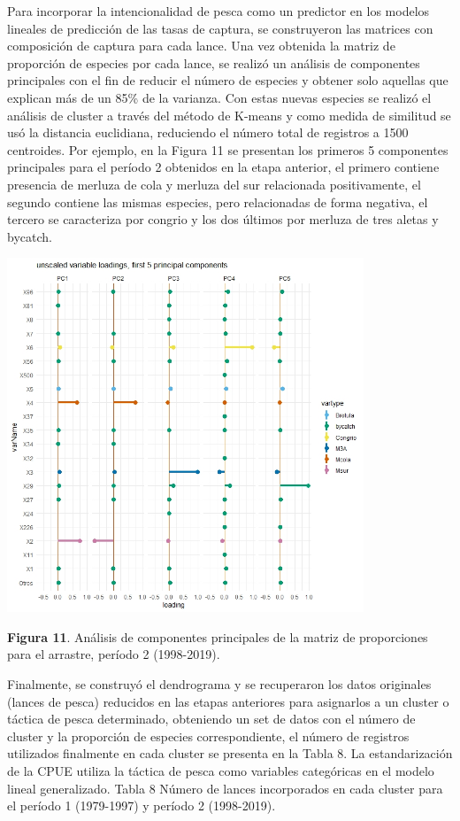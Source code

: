 \documentclass[
  spanish,
]{article}
\begin{document}
Para incorporar la intencionalidad de pesca como un predictor en los
modelos lineales de predicción de las tasas de captura, se construyeron
las matrices con composición de captura para cada lance. Una vez
obtenida la matriz de proporción de especies por cada lance, se realizó
un análisis de componentes principales con el fin de reducir el número
de especies y obtener solo aquellas que explican más de un 85\% de la
varianza. Con estas nuevas especies se realizó el análisis de cluster a
través del método de K-means y como medida de similitud se usó la
distancia euclidiana, reduciendo el número total de registros a 1500
centroides. Por ejemplo, en la Figura 11 se presentan los primeros 5
componentes principales para el período 2 obtenidos en la etapa
anterior, el primero contiene presencia de merluza de cola y merluza del
sur relacionada positivamente, el segundo contiene las mismas especies,
pero relacionadas de forma negativa, el tercero se caracteriza por
congrio y los dos últimos por merluza de tres aletas y bycatch.

\begin{center}
\includegraphics[width=0.8\textwidth]{Figuras/Figura_11.png}
\end{center}

\small \textbf{Figura 11}. Análisis de componentes principales de la
matriz de proporciones para el arrastre, período 2 (1998-2019).
\vspace{0.5cm} \normalsize

Finalmente, se construyó el dendrograma y se recuperaron los datos
originales (lances de pesca) reducidos en las etapas anteriores para
asignarlos a un cluster o táctica de pesca determinado, obteniendo un
set de datos con el número de cluster y la proporción de especies
correspondiente, el número de registros utilizados finalmente en cada
cluster se presenta en la Tabla 8. La estandarización de la CPUE utiliza
la táctica de pesca como variables categóricas en el modelo lineal
generalizado. Tabla 8 Número de lances incorporados en cada cluster para
el período 1 (1979-1997) y período 2 (1998-2019).
\end{document}
